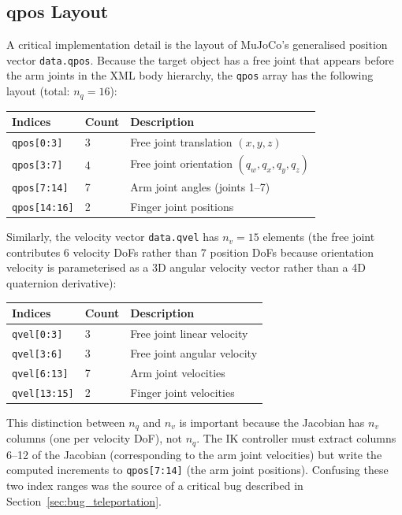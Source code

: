 \documentclass[11pt,a4paper]{report}
\begin{document}
\subsection{qpos Layout}

A critical implementation detail is the layout of MuJoCo's generalised position vector \texttt{data.qpos}. Because the target object has a free joint that appears before the arm joints in the XML body hierarchy, the \texttt{qpos} array has the following layout (total: $n_q = 16$):

\begin{center}
\begin{tabular}{lll}
\toprule
\textbf{Indices} & \textbf{Count} & \textbf{Description} \\
\midrule
\texttt{qpos[0:3]}  & 3 & Free joint translation $(x, y, z)$ \\
\texttt{qpos[3:7]}  & 4 & Free joint orientation $(q_w, q_x, q_y, q_z)$ \\
\texttt{qpos[7:14]} & 7 & Arm joint angles (joints 1--7) \\
\texttt{qpos[14:16]} & 2 & Finger joint positions \\
\bottomrule
\end{tabular}
\end{center}

Similarly, the velocity vector \texttt{data.qvel} has $n_v = 15$ elements (the free joint contributes 6 velocity DoFs rather than 7 position DoFs because orientation velocity is parameterised as a 3D angular velocity vector rather than a 4D quaternion derivative):

\begin{center}
\begin{tabular}{lll}
\toprule
\textbf{Indices} & \textbf{Count} & \textbf{Description} \\
\midrule
\texttt{qvel[0:3]}  & 3 & Free joint linear velocity \\
\texttt{qvel[3:6]}  & 3 & Free joint angular velocity \\
\texttt{qvel[6:13]} & 7 & Arm joint velocities \\
\texttt{qvel[13:15]} & 2 & Finger joint velocities \\
\bottomrule
\end{tabular}
\end{center}

This distinction between $n_q$ and $n_v$ is important because the Jacobian has $n_v$ columns (one per velocity DoF), not $n_q$. The IK controller must extract columns 6--12 of the Jacobian (corresponding to the arm joint velocities) but write the computed increments to \texttt{qpos[7:14]} (the arm joint positions). Confusing these two index ranges was the source of a critical bug described in Section~\ref{sec:bug_teleportation}.
\end{document}
